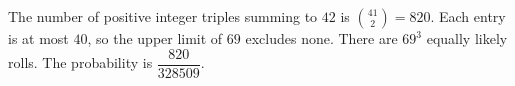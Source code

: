 The number of positive integer triples summing to $42$ is $\binom{41}{2}=820$. Each entry is at most $40$, so the upper limit of $69$ excludes none. There are $69^3$ equally likely rolls. The probability is $\boxed{\dfrac{820}{328509}}$.
